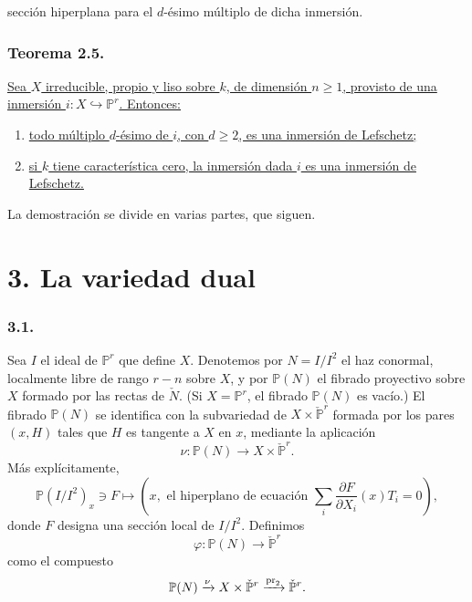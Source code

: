 \pageoriginale

sección hiperplana para el $d$-ésimo múltiplo de dicha inmersión.

\subsubsection*{Teorema 2.5.}
\underline{Sea $X$ irreducible, propio y liso sobre $k$, de dimensión
$n\geq1$, provisto de una inmersión
$i:X\hookrightarrow\mathbb P^r$. Entonces:}
\begin{enumerate}
\item[2.5.1.] \underline{todo múltiplo $d$-ésimo de $i$, con
$d\geq2$, es una inmersión de Lefschetz;}
\item[2.5.2.] \underline{si $k$ tiene característica cero, la
inmersión dada $i$ es una inmersión de Lefschetz.}
\end{enumerate}
La demostración se divide en varias partes, que siguen.

\section*{3. La variedad dual}

\subsubsection*{3.1.}
Sea $I$ el ideal de $\mathbb P^r$ que define $X$. Denotemos por
$N=I/I^2$ el haz conormal, localmente libre de rango $r-n$ sobre $X$,
y por $\mathbb P(N)$ el fibrado proyectivo sobre $X$ formado por las
rectas de $\check N$. (Si $X=\mathbb P^r$, el fibrado
$\mathbb P(N)$ es vacío.) El fibrado $\mathbb P(N)$ se identifica con
la subvariedad de $X\times\check{\mathbb P}^{r}$ formada por los pares
$(x,H)$ tales que $H$ es tangente a $X$ en $x$, mediante la aplicación
\[
\nu:\mathbb P(N)\longrightarrow X\times\check{\mathbb P}^{r}.
\]
Más explícitamente,
\begin{equation}\tag{3.1.1}
\mathbb P(I/I^2)_x\ni F\longmapsto
\left(x,\text{ el hiperplano de ecuación }
\sum_i\frac{\partial F}{\partial X_i}(x)T_i=0\right),
\end{equation}
donde $F$ designa una sección local de $I/I^2$. Definimos
\begin{equation}\tag{3.1.2}
\varphi:\mathbb P(N)\longrightarrow\check{\mathbb P}^{r}
\end{equation}
como el compuesto
\[
\mathbb P(N)\xrightarrow{\nu}
X\times\check{\mathbb P}^{r}
\sisi{\stackrel{\operatorname{pr}_2}{\relbar\joinrel\relbar\joinrel\relbar}}{\xrightarrow{\operatorname{pr}_2}}\check{\mathbb P}^{r}.
\]

